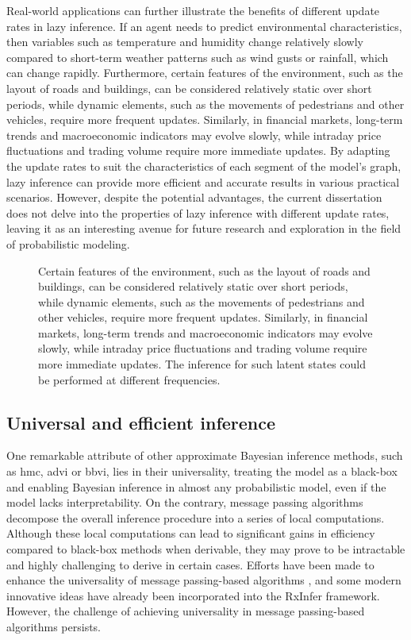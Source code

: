 Real-world applications can further illustrate the benefits of different update rates in lazy
inference.
If an agent needs to predict environmental characteristics, then variables such as temperature and humidity change relatively slowly compared to short-term weather patterns such as wind gusts or rainfall,
which can change rapidly.
Furthermore, certain features of the environment, such as the layout of roads and
buildings, can be considered relatively static over short periods, while dynamic elements,
such as the movements of pedestrians and other vehicles, require more frequent updates.
Similarly, in financial markets, long-term trends and macroeconomic indicators may evolve
slowly, while intraday price fluctuations and trading volume require more immediate updates.
By adapting the update rates to suit the characteristics of each segment of the model's graph,
lazy inference can provide more efficient and accurate results in various practical scenarios.
However, despite the potential advantages, the current dissertation does not delve into the
properties of lazy inference with different update rates, leaving it as an interesting avenue
for future research and exploration in the field of probabilistic modeling.
\begin{figure}
  \centering
  \resizebox{0.85\textwidth}{!}{}
  \caption{Certain features of the environment, such as the layout of roads and
buildings, can be considered relatively static over short periods, while dynamic elements,
such as the movements of pedestrians and other vehicles, require more frequent updates.
Similarly, in financial markets, long-term trends and macroeconomic indicators may evolve
slowly, while intraday price fluctuations and trading volume require more immediate updates.
The inference for such latent states could be performed at different frequencies.}
  \label{fig:conclusion:updaterates}
\end{figure}

\subsection{Universal and efficient inference}

One remarkable attribute of other approximate Bayesian inference methods, such as \ac{hmc}, \ac{advi} or \ac{bbvi}, lies in their universality, treating the model as a black-box and enabling Bayesian inference in almost any probabilistic model, even if the model lacks interpretability.
On the contrary, message passing algorithms decompose the
overall inference procedure into a series of local computations.
Although these local computations can lead to significant gains in efficiency compared to
black-box methods when derivable, they may prove to be intractable and highly challenging to
derive in certain cases.
Efforts have been made to enhance the universality of message passing-based algorithms
\citep{akbayrak_probabilistic_2022}, and some modern innovative ideas have already been incorporated
into the RxInfer framework.
However, the challenge of achieving universality in message passing-based algorithms persists.

